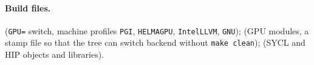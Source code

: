 \paragraph{Build files.}  (\texttt{GPU=} switch, machine profiles \texttt{PGI}, \texttt{HELMAGPU}, \texttt{IntelLLVM}, \texttt{GNU});  (GPU modules, a stamp file so that the tree can switch backend without \texttt{make clean});  (SYCL and HIP objects and libraries).
